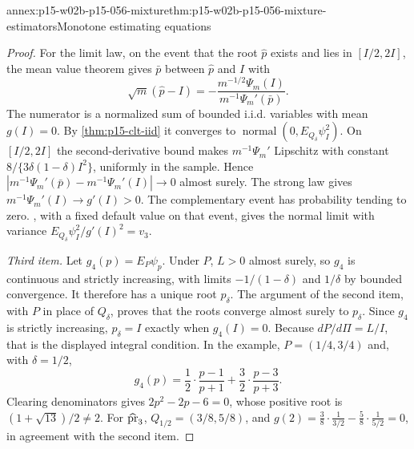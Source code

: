 \begin{annexitem}{annex:p15-w02b-p15-056-mixture}{thm:p15-w02b-p15-056-mixture-estimators}{Monotone estimating equations}
\begin{proof}
For the limit law, on the event that the root \(\widehat p\) exists and
lies in \([I/2,2I]\), the mean value theorem gives \(\bar p\) between
\(\widehat p\) and \(I\) with
\[
 \sqrt m(\widehat p-I)=-\frac{m^{-1/2}\Psi_m(I)}{m^{-1}\Psi_m'(\bar p)} .
\]
The numerator is a normalized sum of bounded i.i.d. variables with mean
\(g(I)=0\). By \cref{thm:p15-clt-iid} it converges to
\(\operatorname{normal}(0,E_{Q_\delta}\psi_I^2)\). On \([I/2,2I]\) the
second-derivative bound makes \(m^{-1}\Psi_m'\) Lipschitz with constant
\(8/\{3\delta(1-\delta)I^2\}\), uniformly in the sample. Hence
\(|m^{-1}\Psi_m'(\bar p)-m^{-1}\Psi_m'(I)|\to0\) almost surely. The strong
law gives \(m^{-1}\Psi_m'(I)\to g'(I)>0\). The complementary event has
probability tending to zero. , with a fixed
default value on that event, gives the normal limit with variance
\(E_{Q_\delta}\psi_I^2/g'(I)^2=v_3\).

\emph{Third item.} Let \(g_4(p)=E_P\psi_p\). Under \(P\), \(L>0\)
almost surely, so \(g_4\) is continuous and strictly increasing, with
limits \(-1/(1-\delta)\) and \(1/\delta\) by bounded convergence. It
therefore has a unique root \(p_\delta\). The argument of the second
item, with \(P\) in place of \(Q_\delta\), proves that the roots
converge almost surely to \(p_\delta\). Since \(g_4\) is strictly
increasing, \(p_\delta=I\) exactly when \(g_4(I)=0\). Because
\(dP/d\Pi=L/I\), that is the displayed integral condition. In the
example, \(P=(1/4,3/4)\) and, with \(\delta=1/2\),
\[
 g_4(p)=\frac12\cdot\frac{p-1}{p+1}+\frac32\cdot\frac{p-3}{p+3}.
\]
Clearing denominators gives \(2p^2-2p-6=0\), whose positive root is
\((1+\sqrt{13})/2\neq2\). For \(\widehat{\rm pr}_3\),
\(Q_{1/2}=(3/8,5/8)\), and
\(g(2)=\tfrac38\cdot\tfrac{1}{3/2}-\tfrac58\cdot\tfrac{1}{5/2}=0\),
in agreement with the second item.
\end{proof}
\end{annexitem}

